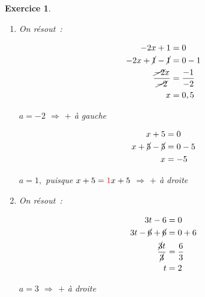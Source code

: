 \documentclass[10pt]{article}
\newtheorem{exo}{Exercice}
\begin{document}
\begin{exo}

\begin{enumerate}
\item \setlength{\columnseprule}{1pt}

\begin{multicols}{2}

On résout~:

\begin{align*}
-2x+1&=0\\
-2x+\cancel{1}-\cancel{1}&=0-1\\
\frac{\cancel{-2}x}{\cancel{-2}}&=\frac{-1}{-2}\\
x&=0,5
\end{align*}

$a=-2$ $\Rightarrow$ $+$ à gauche

\columnbreak

\begin{align*}
x+5&=0\\
x+\cancel{5}-\cancel{5}&=0-5\\
 x&=-5
 \end{align*}
 
 $a=1,$ puisque $x+5=\textcolor{red}{1}x+5$ $\Rightarrow$ $+$ à droite
\end{multicols}

\medskip



\begin{center}
\end{center}

\item \setlength{\columnseprule}{1pt}

\begin{multicols}{2}

On résout~:

\begin{align*}
3t-6&=0\\
3t-\cancel{6}+\cancel{6}&=0+6\\
\frac{\cancel{3}t}{\cancel{3}}&=\frac{6}{3}\\
t&=2
\end{align*}

$a=3$ $\Rightarrow$ $+$ à droite


\end{multicols}
\end{enumerate}
\end{exo}
\end{document}
